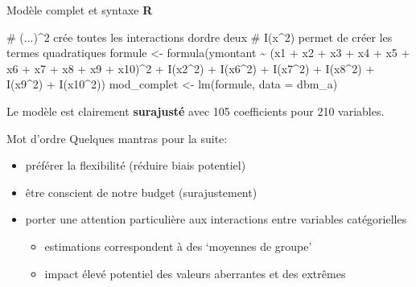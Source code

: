 \documentclass[
  ignorenonframetext,
]{beamer}
\newenvironment{Shaded}{\begin{snugshade}}{\end{snugshade}}
\newcommand{\AttributeTok}[1]{\textcolor[rgb]{0.40,0.45,0.13}{#1}}
\newcommand{\CommentTok}[1]{\textcolor[rgb]{0.37,0.37,0.37}{#1}}
\newcommand{\DecValTok}[1]{\textcolor[rgb]{0.68,0.00,0.00}{#1}}
\newcommand{\FunctionTok}[1]{\textcolor[rgb]{0.28,0.35,0.67}{#1}}
\newcommand{\NormalTok}[1]{\textcolor[rgb]{0.00,0.23,0.31}{#1}}
\newcommand{\OtherTok}[1]{\textcolor[rgb]{0.00,0.23,0.31}{#1}}
\newcommand{\SpecialCharTok}[1]{\textcolor[rgb]{0.37,0.37,0.37}{#1}}
\providecommand{\tightlist}{%
  \setlength{\itemsep}{0pt}\setlength{\parskip}{0pt}}\usepackage{longtable,booktabs,array}
\begin{document}
\begin{frame}[fragile]{Modèle complet et syntaxe \textbf{R}}
\protect\hypertarget{moduxe8le-complet-et-syntaxe-r}{}
\begin{Shaded}
\begin{Highlighting}[numbers=left,,]
\CommentTok{\# (...)\^{}2 crée toutes les interactions d\textquotesingle{}ordre deux}
\CommentTok{\# I(x\^{}2) permet de créer les termes quadratiques}
\NormalTok{formule }\OtherTok{\textless{}{-}} 
  \FunctionTok{formula}\NormalTok{(ymontant }\SpecialCharTok{\textasciitilde{}} 
\NormalTok{          (x1 }\SpecialCharTok{+}\NormalTok{ x2 }\SpecialCharTok{+}\NormalTok{ x3 }\SpecialCharTok{+}\NormalTok{ x4 }\SpecialCharTok{+}\NormalTok{ x5 }\SpecialCharTok{+} 
\NormalTok{             x6 }\SpecialCharTok{+}\NormalTok{ x7 }\SpecialCharTok{+}\NormalTok{ x8 }\SpecialCharTok{+}\NormalTok{ x9 }\SpecialCharTok{+}\NormalTok{ x10)}\SpecialCharTok{\^{}}\DecValTok{2} \SpecialCharTok{+} 
            \FunctionTok{I}\NormalTok{(x2}\SpecialCharTok{\^{}}\DecValTok{2}\NormalTok{) }\SpecialCharTok{+} \FunctionTok{I}\NormalTok{(x6}\SpecialCharTok{\^{}}\DecValTok{2}\NormalTok{) }\SpecialCharTok{+} \FunctionTok{I}\NormalTok{(x7}\SpecialCharTok{\^{}}\DecValTok{2}\NormalTok{) }\SpecialCharTok{+}
            \FunctionTok{I}\NormalTok{(x8}\SpecialCharTok{\^{}}\DecValTok{2}\NormalTok{) }\SpecialCharTok{+} \FunctionTok{I}\NormalTok{(x9}\SpecialCharTok{\^{}}\DecValTok{2}\NormalTok{) }\SpecialCharTok{+} \FunctionTok{I}\NormalTok{(x10}\SpecialCharTok{\^{}}\DecValTok{2}\NormalTok{))}
\NormalTok{mod\_complet }\OtherTok{\textless{}{-}} \FunctionTok{lm}\NormalTok{(formule, }\AttributeTok{data =}\NormalTok{ dbm\_a)}
\end{Highlighting}
\end{Shaded}

Le modèle est clairement \textbf{surajusté} avec 105 coefficients pour
210 variables.
\end{frame}

\begin{frame}{Mot d'ordre}
\protect\hypertarget{mot-dordre}{}
Quelques mantras pour la suite:

\begin{itemize}
\tightlist
\item
  préférer la flexibilité (réduire biais potentiel)
\item
  être conscient de notre budget (surajustement)
\item
  porter une attention particulière aux interactions entre variables
  catégorielles

  \begin{itemize}
  \tightlist
  \item
    estimations correspondent à des `moyennes de groupe'
  \item
    impact élevé potentiel des valeurs aberrantes et des extrêmes
  \end{itemize}
\end{itemize}
\end{frame}
\end{document}
